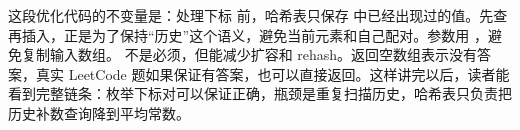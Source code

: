 这段优化代码的不变量是：处理下标  前，哈希表只保存 \code{[0, index)} 中已经出现过的值。先查再插入，正是为了保持“历史”这个语义，避免当前元素和自己配对。参数用 ，避免复制输入数组。 不是必须，但能减少扩容和 rehash。返回空数组表示没有答案，真实 LeetCode 题如果保证有答案，也可以直接返回。这样讲完以后，读者能看到完整链条：枚举下标对可以保证正确，瓶颈是重复扫描历史，哈希表只负责把历史补数查询降到平均常数。







